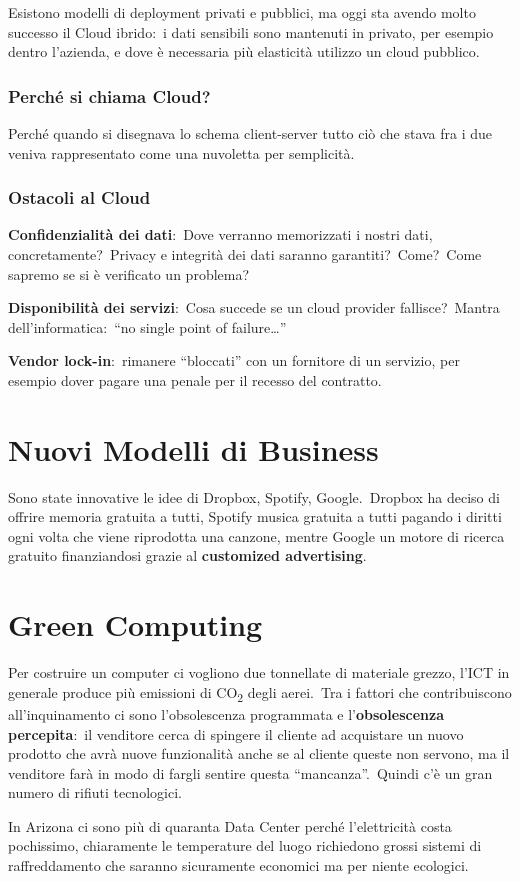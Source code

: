 \noindent Esistono modelli di deployment privati e pubblici, ma oggi sta avendo molto successo il Cloud ibrido:\ i dati sensibili sono mantenuti in privato, per esempio dentro l'azienda, e dove è necessaria più elasticità utilizzo un cloud pubblico.

\subsubsection{Perché si chiama Cloud?}

Perché quando si disegnava lo schema client-server tutto ciò che stava fra i due veniva rappresentato come una nuvoletta per semplicità.

\subsubsection{Ostacoli al Cloud}

\textbf{Confidenzialità dei dati}:\ Dove verranno memorizzati i nostri dati, concretamente?\ Privacy e integrità dei dati saranno garantiti?\ Come?\ Come sapremo se si è verificato un problema?

\noindent\textbf{Disponibilità dei servizi}:\ Cosa succede se un cloud provider fallisce?\ Mantra dell'informatica:\ ``no single point of failure\dots''

\noindent\textbf{Vendor lock-in}:\ rimanere ``bloccati'' con un fornitore di un servizio, per esempio dover pagare una penale per il recesso del contratto.

\section{Nuovi Modelli di Business}
Sono state innovative le idee di Dropbox, Spotify, Google.\
Dropbox ha deciso di offrire memoria gratuita a tutti, Spotify musica gratuita a tutti pagando i diritti ogni volta che viene riprodotta una canzone, mentre Google un motore di ricerca gratuito finanziandosi grazie al \textbf{customized advertising}.

\section{Green Computing}

Per costruire un computer ci vogliono due tonnellate di materiale grezzo, l'ICT in generale produce più emissioni di CO\textsubscript{2} degli aerei.\
Tra i fattori che contribuiscono all'inquinamento ci sono l'obsolescenza programmata e l'\textbf{obsolescenza} \textbf{percepita}:\ il venditore cerca di spingere il cliente ad acquistare un nuovo prodotto che avrà nuove funzionalità anche se al cliente queste non servono, ma il venditore farà in modo di fargli sentire questa ``mancanza''.\
Quindi c'è un gran numero di rifiuti tecnologici.\

In Arizona ci sono più di quaranta Data Center perché l'elettricità costa pochissimo, chiaramente le temperature del luogo richiedono grossi sistemi di raffreddamento che saranno sicuramente economici ma per niente ecologici.

